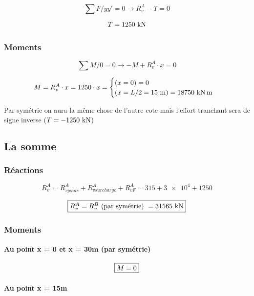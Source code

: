 \documentclass[12pt,a4paper]{article}
\begin{document}
	\[ \sum F/yy' = 0 \rightarrow R_{v}^{A} - T = 0 \]
	
	\[ T = 1250\kn \]
	
	\subsubsection{Moments}
	
	\[ \sum M/0 = 0 \rightarrow  - M + R_{v}^{A} \cdot x = 0 \]

	\[ M = R_{v}^{A} \cdot x = 1250 \cdot x = \begin{cases}
		(x = 0)  = 0 \\
		(x = L/2 = 15\meterl) = 18750\knxm
	\end{cases} \]
	
	
	\begin{tcolorbox}[colback=gray!20, colframe=black, title=Remarque]
		Par symétrie on aura la même chose de l'autre cote mais l'effort tranchant sera de signe inverse ($T =  - 1250\kn$)
	\end{tcolorbox}


	
	
	\subsection{La somme}
	
	\subsubsection{Réactions}
	
	\[ R_{v}^{A} = R_{vpoids}^{A} + R_{vsurcharge}^{A} + R_{vF}^{A} = 315+\num{3e4}+1250 \]
	
	\[ \fbox{$R_{v}^{A} = R_{v}^{B} \text{ (par symétrie) } = 31565\kn$} \]


	\subsubsection{Moments}
	
	
	\paragraph{Au point x = 0 et x = 30m (par symétrie)}

	\[ \fbox{$M = 0$} \]
	
	\paragraph{Au point x = 15m}
	
\end{document}
